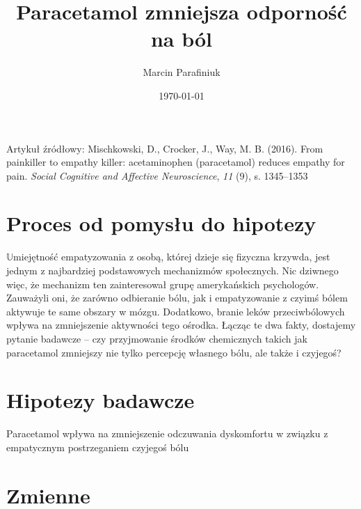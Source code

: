 \documentclass[12pt]{article}
\title{Paracetamol zmniejsza odporność na ból}
\author{Marcin Parafiniuk}
\date{\today}
\newcommand{\bb}[1]{$\mathbb{#1}$}
\newcommand{\apaartykul}[7]{#1 (#2). #3. \textit{#4}, \textit{#5} (#6), s. #7}
\begin{document}
\maketitle

Artykuł źródłowy: 
\apaartykul{Mischkowski, D., Crocker, J., Way, M. B.}{2016}{From painkiller to empathy killer: acetaminophen (paracetamol) reduces empathy for pain}{Social Cognitive and Affective Neuroscience}{11}{9}{1345–1353}

\section{Proces od pomysłu do hipotezy}

\bb{U}miejętność empatyzowania z osobą, której dzieje się fizyczna krzywda, jest jednym z najbardziej
podstawowych mechanizmów społecznych. Nic dziwnego więc, że mechanizm ten zainteresował grupę
amerykańskich psychologów. Zauważyli oni, że zarówno odbieranie bólu, jak i empatyzowanie z
czyimś bólem aktywuje te same obszary w mózgu. Dodatkowo, branie leków przeciwbólowych
wpływa na zmniejszenie aktywności tego ośrodka. Łącząc te dwa fakty, dostajemy pytanie badawcze –
czy przyjmowanie środków chemicznych takich jak paracetamol zmniejszy nie tylko percepcję
własnego bólu, ale także i czyjegoś?

\section{Hipotezy badawcze}

Paracetamol wpływa na zmniejszenie odczuwania dyskomfortu w związku z empatycznym postrzeganiem czyjegoś bólu

\section{Zmienne}
\end{document}
